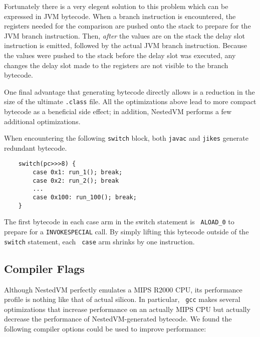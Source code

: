 \documentclass{acmconf}
\begin{document}
Fortunately there is a very elegent solution to this problem which can
be expressed in JVM bytecode.  When a branch instruction is
encountered, the registers needed for the comparison are pushed onto
the stack to prepare for the JVM branch instruction.  Then, {\it
after} the values are on the stack the delay slot instruction is
emitted, followed by the actual JVM branch instruction.  Because the
values were pushed to the stack before the delay slot was executed, any
changes the delay slot made to the registers are not visible to the
branch bytecode.

One final advantage that generating bytecode directly allows is a
reduction in the size of the ultimate {\tt .class} file.  All the
optimizations above lead to more compact bytecode as a beneficial side
effect; in addition, NestedVM performs a few additional optimizations.

When encountering the following {\tt switch} block, both {\tt javac}
and {\tt jikes} generate redundant bytecode.

{\footnotesize\begin{verbatim}
    switch(pc>>>8) {
        case 0x1: run_1(); break;
        case 0x2: run_2(); break
        ...
        case 0x100: run_100(); break;
    }
\end{verbatim}}

The first bytecode in each case arm in the switch statement is {\tt
ALOAD\_0} to prepare for a {\tt INVOKESPECIAL} call.  By simply
lifting this bytecode outside of the {\tt switch} statement, each {\tt
case} arm shrinks by one instruction.

\subsection{Compiler Flags}

Although NestedVM perfectly emulates a MIPS R2000 CPU, its performance
profile is nothing like that of actual silicon.  In particular, {\tt
gcc} makes several optimizations that increase performance on an
actually MIPS CPU but actually decrease the performance of
NestedVM-generated bytecode.  We found the following compiler options
could be used to improve performance:
\end{document}
